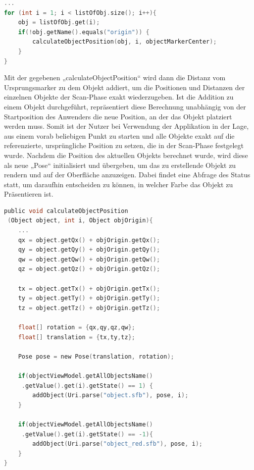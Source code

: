 \begin{lstlisting}[language=C,
    frame=lines,           % Ein Rahmen um den Code (single for box, lines for top and bottom)
    xleftmargin=\parindent,  % Rahmen link von den Zahlen
    style=algoBericht,
    label={code:listOfObjects},
    captionpos=b,           % Caption unter den Code setzen
caption={Abfolge der Objekte in der Liste}]
... 
for (int i = 1; i < listOfObj.size(); i++){
    obj = listOfObj.get(i);
    if(!obj.getName().equals("origin")) {
        calculateObjectPosition(obj, i, objectMarkerCenter);
    }
}
\end{lstlisting}
Mit der gegebenen „calculateObjectPosition“ wird dann die Distanz vom Ursprungsmarker zu dem Objekt addiert, um 
die Positionen und Distanzen der einzelnen Objekte der Scan-Phase exakt wiederzugeben. Ist die Addition zu einem Objekt durchgeführt, repräsentiert diese 
Berechnung unabhängig von der Startposition des Anwenders die neue Position, an der das Objekt platziert werden muss. Somit ist der Nutzer bei Verwendung der 
Applikation in der Lage, aus einem vorab beliebigen Punkt zu starten und alle Objekte exakt auf die referenzierte, ursprüngliche Position zu setzen, die 
in der Scan-Phase festgelegt wurde. Nachdem die Position des aktuellen Objekts berechnet wurde, wird diese als neue „Pose“ initialisiert und übergeben, um 
das zu erstellende Objekt zu rendern und auf der Oberfläche anzuzeigen. Dabei findet eine Abfrage des Status statt, um daraufhin 
entscheiden zu können, in welcher Farbe das Objekt zu Präsentieren ist.  
\\ 
\begin{lstlisting}[language=C,
    frame=lines,           % Ein Rahmen um den Code (single for box, lines for top and bottom)
    xleftmargin=\parindent,  % Rahmen link von den Zahlen
    style=algoBericht,
    label={code:additionOfObject},
    captionpos=b,           % Caption unter den Code setzen
caption={Berechnung der Markerplatzierung}]
public void calculateObjectPosition
 (Object object, int i, Object objOrigin){
    ... 
    qx = object.getQx() + objOrigin.getQx();
    qy = object.getQy() + objOrigin.getQy();
    qw = object.getQw() + objOrigin.getQw();
    qz = object.getQz() + objOrigin.getQz();

    tx = object.getTx() + objOrigin.getTx();
    ty = object.getTy() + objOrigin.getTy();
    tz = object.getTz() + objOrigin.getTz();

    float[] rotation = {qx,qy,qz,qw};
    float[] translation = {tx,ty,tz};

    Pose pose = new Pose(translation, rotation);

    if(objectViewModel.getAllObjectsName()
     .getValue().get(i).getState() == 1) {
        addObject(Uri.parse("object.sfb"), pose, i);
    }

    if(objectViewModel.getAllObjectsName()
     .getValue().get(i).getState() == -1){
        addObject(Uri.parse("object_red.sfb"), pose, i);
    }
}
\end{lstlisting}
